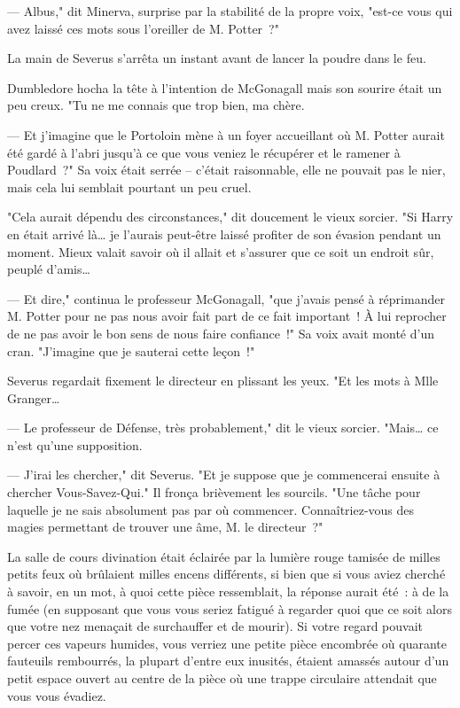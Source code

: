 --- Albus," dit Minerva, surprise par la stabilité de la propre voix, "est-ce vous qui avez laissé ces mots sous l'oreiller de M. Potter~?"

La main de Severus s'arrêta un instant avant de lancer la poudre dans le feu.

Dumbledore hocha la tête à l'intention de McGonagall mais son sourire était un peu creux. "Tu ne me connais que trop bien, ma chère.

--- Et j'imagine que le Portoloin mène à un foyer accueillant où M. Potter aurait été gardé à l'abri jusqu'à ce que vous veniez le récupérer et le ramener à Poudlard~?" Sa voix était serrée -- c'était raisonnable, elle ne pouvait pas le nier, mais cela lui semblait pourtant un peu cruel.

"Cela aurait dépendu des circonstances," dit doucement le vieux sorcier. "Si Harry en était arrivé là… je l'aurais peut-être laissé profiter de son évasion pendant un moment. Mieux valait savoir où il allait et s'assurer que ce soit un endroit sûr, peuplé d'amis…

--- Et dire," continua le professeur McGonagall, "que j'avais pensé à réprimander M. Potter pour ne pas nous avoir fait part de ce fait important~! À lui reprocher de ne pas avoir le bon sens de nous faire confiance~!" Sa voix avait monté d'un cran. "J'imagine que je sauterai cette leçon~!"

Severus regardait fixement le directeur en plissant les yeux. "Et les mots à Mlle Granger…

--- Le professeur de Défense, très probablement," dit le vieux sorcier. "Mais… ce n'est qu'une supposition.

--- J'irai les chercher," dit Severus. "Et je suppose que je commencerai ensuite à chercher Vous-Savez-Qui." Il fronça brièvement les sourcils. "Une tâche pour laquelle je ne sais absolument pas par où commencer. Connaîtriez-vous des magies permettant de trouver une âme, M. le directeur~?"

\later

La salle de cours divination était éclairée par la lumière rouge tamisée de milles petits feux où brûlaient milles encens différents, si bien que si vous aviez cherché à savoir, en un mot, à quoi cette pièce ressemblait, la réponse aurait été~: à de la fumée (en supposant que vous vous seriez fatigué à regarder quoi que ce soit alors que votre nez menaçait de surchauffer et de mourir). Si votre regard pouvait percer ces vapeurs humides, vous verriez une petite pièce encombrée où quarante fauteuils rembourrés, la plupart d'entre eux inusités, étaient amassés autour d'un petit espace ouvert au centre de la pièce où une trappe circulaire attendait que vous vous évadiez.

